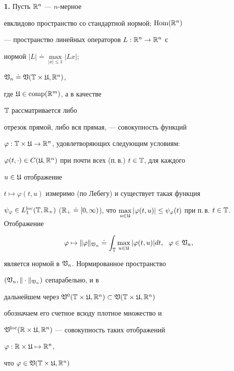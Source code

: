 {\bf 1.} Пусть $\Bbb R^{n}$ --- $n$-мерное


евклидово пространство со стандартной нормой; $\operatorname{Hom}(\Bbb R^n)$


--- пространство линейных операторов $L:\Bbb R^n\to\Bbb R^n$ с


нормой $|L|\doteq\max\limits_{|x|\le 1}|Lx|$;


$\frak V_n\doteq\frak V(\Bbb T\times\frak U,\Bbb R^n)$,


где $\frak U\in\operatorname{comp}(\Bbb R^m)$, а в качестве 


$\Bbb T$ рассматривается либо


отрезок прямой, либо вся прямая, --- совокупность функций


$\varphi :\Bbb T\times\frak U\to\Bbb R^n$, удовлетворяющих следующим условиям:


$\varphi (t,\cdot)\in


C(\frak U,\bR^n)$ при почти всех (п.\,в.) $t\in\bT$, для каждого


$u\in\frak U$ отображение


$t\mapsto\varphi(t,u)$ измеримо (по Лебегу) и существует такая функция


$\psi_\varphi\in L_1^{\loc}(\bT,\bR_+)$ ($\bR_+


\doteq[0,\infty)$), что $\max\limits_{u\in\frak U}|


\varphi(t,u)|\le\psi_{\varphi}(t)$ при п.\,в. $t\in\bT$. Отображение


\begin{equation*}


\varphi\mapsto\|\varphi\|_{\frak V_n}


\doteq\int_{\bT}\max_{u\in\frak U}|\varphi(t,u)|dt,


\ \ \varphi\in\frak V_n,


\end{equation*}


является нормой в $\frak V_n$. Нормированное пространство


$(\frak V_n,\|\cdot\|_{\frak V_n})$ сепарабельно, и в


дальнейшем через $\frak V^0(\bT\times\frak U,\bR^n)


\subset\frak V(\bT\times\frak U,\bR^n)$


обозначаем его счетное всюду плотное множество и


$\frak V^{\operatorname{loc}}(\Bbb R\times\frak U,\Bbb R^n)$ --- совокупность таких отображений


$\varphi:\Bbb R\times\frak U\mapsto\Bbb R^n$,


что $\varphi\in\frak V(\Bbb T\times\frak U,\Bbb R^n)$


